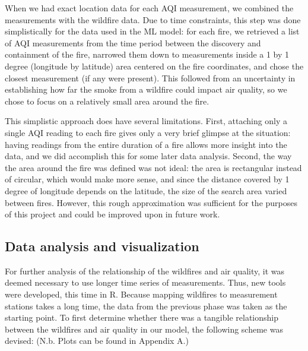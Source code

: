 \documentclass[a4paper,12pt]{article}
\begin{document}
When we had exact location data for each AQI measurement, we combined the measurements with the wildfire data. Due to time constraints, this step was done simplistically for the data used in the ML model: for each fire, we retrieved a list of AQI measurements from the time period between the discovery and containment of the fire, narrowed them down to measurements inside a 1 by 1 degree (longitude by latitude) area centered on the fire coordinates, and chose the closest measurement (if any were present). This followed from an uncertainty in establishing how far the smoke from a wildfire could impact air quality, so we chose to focus on a relatively small area around the fire.

This simplistic approach does have several limitations. First, attaching only a single AQI reading to each fire gives only a very brief glimpse at the situation: having readings from the entire duration of a fire allows more insight into the data, and we did accomplish this for some later data analysis. Second, the way the area around the fire was defined was not ideal: the area is rectangular instead of circular, which would make more sense, and since the distance covered by 1 degree of longitude depends on the latitude, the size of the search area varied between fires. However, this rough approximation was sufficient for the purposes of this project and could be improved upon in future work.

\subsection{Data analysis and visualization}

For further analysis of the relationship of the wildfires and air quality, it was deemed necessary to use longer time series of measurements. Thus, new tools were developed, this time in R. Because mapping wildfires to measurement stations takes a long time, the data from the previous phase was taken as the starting point. To first determine whether there was a tangible relationship between the wildfires and air quality in our model, the following scheme was devised: (N.b. Plots can be found in Appendix A.)
\end{document}
